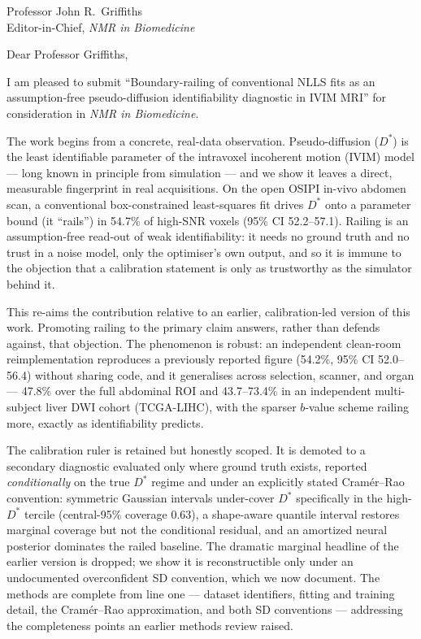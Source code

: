 \documentclass[11pt]{letter}
\begin{document}
\begin{letter}{Professor John R.\ Griffiths \\ Editor-in-Chief, \textit{NMR in Biomedicine}}
\opening{Dear Professor Griffiths,}

I am pleased to submit ``Boundary-railing of conventional NLLS fits as an
assumption-free pseudo-diffusion identifiability diagnostic in IVIM MRI'' for
consideration in \textit{NMR in Biomedicine}.

The work begins from a concrete, real-data observation. Pseudo-diffusion
($D^{*}$) is the least identifiable parameter of the intravoxel incoherent motion
(IVIM) model --- long known in principle from simulation --- and we show it leaves
a direct, measurable fingerprint in real acquisitions. On the open OSIPI in-vivo
abdomen scan, a conventional box-constrained least-squares fit drives $D^{*}$ onto
a parameter bound (it ``rails'') in 54.7\% of high-SNR voxels (95\% CI
52.2--57.1). Railing is an assumption-free read-out of weak identifiability: it
needs no ground truth and no trust in a noise model, only the optimiser's own
output, and so it is immune to the objection that a calibration statement is only
as trustworthy as the simulator behind it.

This re-aims the contribution relative to an earlier, calibration-led version of
this work. Promoting railing to the primary claim answers, rather than defends
against, that objection. The phenomenon is robust: an independent clean-room
reimplementation reproduces a previously reported figure (54.2\%, 95\% CI
52.0--56.4) without sharing code, and it generalises across selection, scanner,
and organ --- 47.8\% over the full abdominal ROI and 43.7--73.4\% in an
independent multi-subject liver DWI cohort (TCGA-LIHC), with the sparser $b$-value
scheme railing more, exactly as identifiability predicts.

The calibration ruler is retained but honestly scoped. It is demoted to a
secondary diagnostic evaluated only where ground truth exists, reported
\emph{conditionally} on the true $D^{*}$ regime and under an explicitly stated
Cram\'er--Rao convention: symmetric Gaussian intervals under-cover $D^{*}$
specifically in the high-$D^{*}$ tercile (central-95\% coverage 0.63), a shape-aware
quantile interval restores marginal coverage but not the conditional residual, and
an amortized neural posterior dominates the railed baseline. The dramatic marginal
headline of the earlier version is dropped; we show it is reconstructible only
under an undocumented overconfident SD convention, which we now document. The
methods are complete from line one --- dataset identifiers, fitting and training
detail, the Cram\'er--Rao approximation, and both SD conventions --- addressing the
completeness points an earlier methods review raised.


\end{letter}
\end{document}

